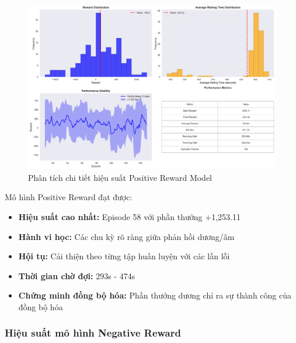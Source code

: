 \begin{figure}[!htp]
    \centering
    \includegraphics[width=\textwidth]{figures/sync_positive_model_summary.png}
    \caption{Phân tích chi tiết hiệu suất Positive Reward Model}
    \label{fig:sync_positive_model_summary}
\end{figure}

Mô hình Positive Reward đạt được:
\begin{itemize}
    \item \textbf{Hiệu suất cao nhất:} Episode 58 với phần thưởng +1,253.11

    \item \textbf{Hành vi học:} Các chu kỳ rõ ràng giữa phản hồi dương/âm

    \item \textbf{Hội tụ:} Cải thiện theo từng tập huấn luyện với các lần lỗi

    \item \textbf{Thời gian chờ đợi:} 293s - 474s

    \item \textbf{Chứng minh đồng bộ hóa:} Phần thưởng dương chỉ ra sự thành công
        của đồng bộ hóa
\end{itemize}

\subsubsection{Hiệu suất mô hình Negative Reward}

